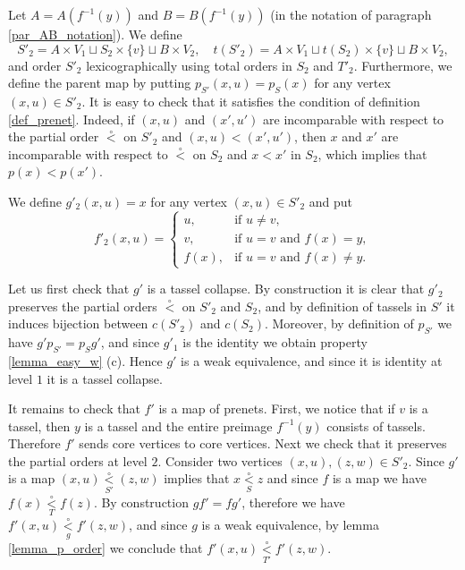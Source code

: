 \documentclass[letterpaper,12pt,leqno]{article}
\numberwithin{equation}{theorem}
\def\lesub{\mathop{<}\limits}
\def\pless{\lesub^\circ}
\begin{document}
Let $A = A(f^{-1}(y))$ and $B = B(f^{-1}(y))$ (in the notation of paragraph \ref{par_AB_notation}). We define
$$
S'_2 = A \times V_1 \sqcup S_2 \times \{v\} \sqcup B \times V_2, \quad t(S'_2) = A \times V_1 \sqcup t(S_2) \times \{v\} \sqcup B \times V_2,
$$
and order $S'_2$ lexicographically using total orders in $S_2$ and $T'_2$. Furthermore, we define the parent map by putting $p_{S'}(x, u) = p_S(x)$ for any vertex $(x, u) \in S'_2$.
It is easy to check that it satisfies the condition of definition \ref{def_prenet}. Indeed, if $(x, u)$ and $(x', u')$ are incomparable with respect to the partial order $\pless$ on $S'_2$
and $(x, u) < (x', u')$, then $x$ and $x'$ are incomparable with respect to $\pless$ on $S_2$ and $x < x'$ in $S_2$, which implies that $p(x) < p(x')$.

We define $g'_2(x, u) = x$ for any vertex $(x, u) \in S'_2$ and put
$$
f'_2(x, u) = \begin{cases}
u,&\text{if $u \neq v$},\\
v,&\text{if $u = v$ and $f(x) = y$},\\
f(x),&\text{if $u = v$ and $f(x) \neq y$}.
\end{cases}
$$

Let us first check that $g'$ is a tassel collapse. By construction it is clear that $g'_2$ preserves the partial orders $\pless$ on $S'_2$ and $S_2$, and by definition of tassels in $S'$
it induces bijection between $c(S'_2)$ and $c(S_2)$. Moreover, by definition of $p_{S'}$ we have $g'p_{S'} = p_S g'$, and since $g'_1$ is the identity we obtain property \ref{lemma_easy_w} (c).
Hence $g'$ is a weak equivalence, and since it is identity at level $1$ it is a tassel collapse.

It remains to check that $f'$ is a map of prenets. First, we notice that if $v$ is a tassel, then $y$ is a tassel and the entire preimage $f^{-1}(y)$ consists of tassels. Therefore $f'$
sends core vertices to core vertices. Next we check that it preserves the partial orders at level $2$. Consider two vertices $(x, u), (z, w) \in S'_2$. Since $g'$ is
a map $(x, u) \pless_{S'} (z, w)$ implies that $x \pless_S z$ and since $f$ is a map we have $f(x) \pless_T f(z)$. By construction $gf' = fg'$, therefore we have
$f'(x, u) \pless_g f'(z, w)$, and since $g$ is a weak equivalence, by lemma \ref{lemma_p_order} we conclude that $f'(x, u) \pless_{T'} f'(z, w)$.
\end{document}
